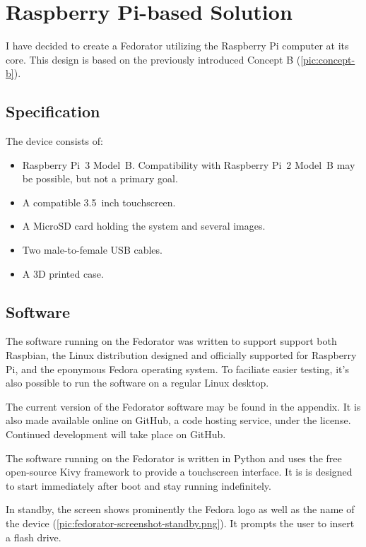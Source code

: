 \chapter{Raspberry Pi-based Solution}
    I have decided to create a Fedorator utilizing the Raspberry Pi computer at its core.  This design is based on the previously introduced Concept B (\ref{pic:concept-b}).
    \section{Specification}
        The device consists of:
        \begin{itemize}
            \item Raspberry Pi~3 Model~B.  Compatibility with Raspberry Pi~2 Model~B may be possible, but not a primary goal.
            \item A compatible 3.5~inch touchscreen.
            \item A MicroSD card holding the system and several images.
            \item Two male-to-female USB cables.
            \item A 3D printed case.
        \end{itemize}
    
    \section{Software}
        The software running on the Fedorator was written to support support both Raspbian, the Linux distribution designed and officially supported for Raspberry Pi\cite{raspian}, and the eponymous Fedora operating system.  To faciliate easier testing, it's also possible to run the software on a regular Linux desktop.
        
        The current version of the Fedorator software may be found in the appendix.  It is also made available online on GitHub, a code hosting service, under the  license\cite{fedorator-github}.  Continued development will take place on GitHub.  
        
        The software running on the Fedorator is written in Python and uses the free open-source Kivy framework\cite{kivy} to provide a touchscreen interface.  It is is designed to start immediately after boot and stay running indefinitely.
        
        In standby, the screen shows prominently the Fedora logo as well as the name of the device (\ref{pic:fedorator-screenshot-standby.png}).  It prompts the user to insert a flash drive.
        
